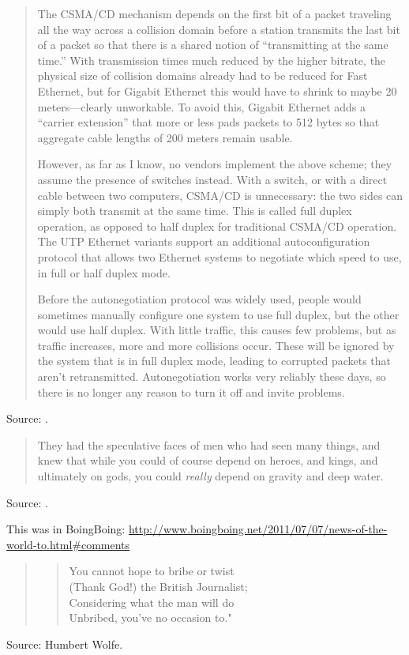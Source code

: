 \documentclass[a4paper]{article}
\begin{document}
\begin{quotation}
	The CSMA/CD mechanism depends on the first bit of a packet traveling all the way across a
collision domain before a station transmits the last bit of a packet so that there is a shared
notion of ``transmitting at the same time.'' With transmission times much reduced by the higher
bitrate, the physical size of collision domains already had to be reduced for Fast Ethernet, but
for Gigabit Ethernet this would have to shrink to maybe 20 meters---clearly unworkable. To avoid
this, Gigabit Ethernet adds a ``carrier extension'' that more or less pads packets to 512 bytes
so that aggregate cable lengths of 200 meters remain usable. 

However, as far as I know, no vendors implement the above scheme; they assume the presence of
switches instead. With a switch, or with a direct cable between two computers, CSMA/CD is
unnecessary: the two sides can simply both transmit at the same time. This is called full duplex
operation, as opposed to half duplex for traditional CSMA/CD operation. The UTP Ethernet variants
support an additional autoconfiguration protocol that allows two Ethernet systems to negotiate
which speed to use, in full or half duplex mode.

Before the autonegotiation protocol was widely used, people would sometimes manually configure one
system to use full duplex, but the other would use half duplex. With little traffic, this causes
few problems, but as traffic increases, more and more collisions occur. These will be ignored by
the system that is in full duplex mode, leading to corrupted packets that aren't retransmitted.
Autonegotiation works very reliably these days, so there is no longer any reason to turn it off and
invite problems. 
\end{quotation}
Source: \citet{vanBeijnum2011}.
\medskip

\begin{quote}
	They had the speculative faces of men who had seen many things, and knew that while you could
of course depend on heroes, and kings, and ultimately on gods, you could \emph{really} depend on
gravity and deep water.
\end{quote}
Source: \citet[p.~293]{Pratchett1989}.
\medskip

This was in BoingBoing:
\url{http://www.boingboing.net/2011/07/07/news-of-the-world-to.html#comments}
\begin{quote}
	\begin{verse}
		You cannot hope to bribe or twist \\
		(Thank God!) the British Journalist; \\
		Considering what the man will do \\
		Unbribed, you've no occasion to." \\
	\end{verse}
\end{quote}
Source: Humbert Wolfe.
\medskip
\end{document}
